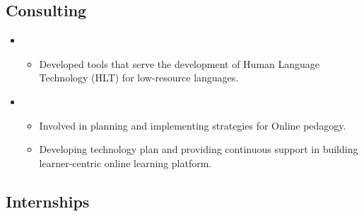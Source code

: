 \documentclass[11pt,a4paper,sans]{moderncv}
\begin{document}
\vspace{6pt}

\subsection{Consulting}

\begin{itemize}

\vspace{6pt}

\item{}

\begin{itemize}

    \item Developed tools that serve the development of Human Language Technology (HLT) for low-resource languages.

\end{itemize}

\vspace{6pt}

\item{}

\begin{itemize}

    \item Involved in planning and implementing strategies for Online pedagogy.

    \item Developing technology plan and providing continuous support in building learner-centric online learning platform.

\end{itemize}

\end{itemize}

\vspace{6pt}

\subsection{Internships}
\end{document}

